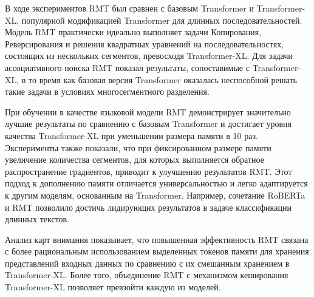 В ходе экспериментов RMT был сравнен с базовым Transformer и Transformer-XL, популярной модификацией Transformer для длинных последовательностей. Модель RMT практически идеально выполняет задачи Копирования, Реверсирования и решения квадратных уравнений на последовательностях, состоящих из нескольких сегментов, превосходя Transformer-XL. Для задачи ассоциативного поиска RMT показал результаты, сопоставимые с Transformer-XL, в то время как базовая версия Transformer оказалась неспособной решать такие задачи в условиях многосегментного разделения.

При обучении в качестве языковой модели RMT демонстрирует значительно лучшие результаты по сравнению с базовым Transformer и достигает уровня качества Transformer-XL при уменьшении размера памяти в 10 раз. Эксперименты также показали, что при фиксированном размере памяти увеличение количества сегментов, для которых выполняется обратное распространение градиентов, приводит к улучшению результатов RMT. Этот подход к дополнению памяти отличается универсальностью и легко адаптируется к другим моделям, основанным на Transformer. Например, сочетание RoBERTa и RMT позволило достичь лидирующих результатов в задаче классификации длинных текстов.

Анализ карт внимания показывает, что повышенная эффективность RMT связана с более рациональным использованием выделенных токенов памяти для хранения представлений входных данных по сравнению с их смешанным хранением в Transformer-XL. Более того, объединение RMT с механизмом кеширования Transformer-XL позволяет превзойти каждую из моделей.



